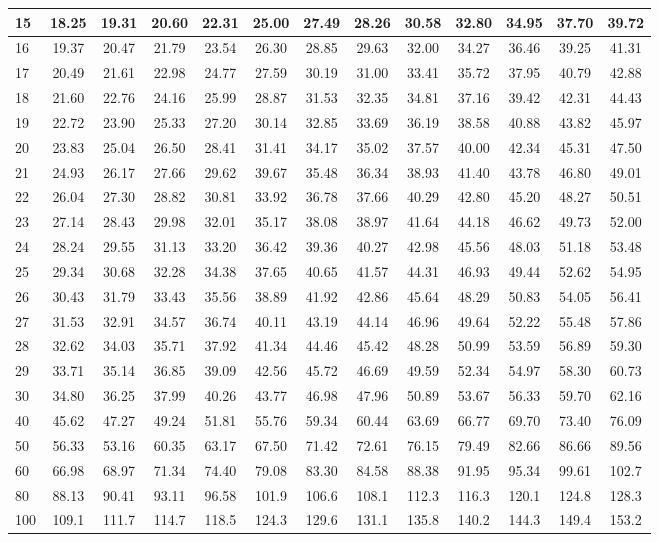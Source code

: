 \documentclass[11pt,openany]{book}\usepackage[]{graphicx}\usepackage[]{color}
\begin{document}
\begin{table}[h]
{\begin{tabular}{|l|c|c|c|c|c|c|c|c|c|c|c|c|}
15 & 18.25 & 19.31 & 20.60 & 22.31 & 25.00 & 27.49 & 28.26 & 30.58 & 32.80 & 34.95 & 37.70 & 39.72 \\ \hline
16 & 19.37 & 20.47 & 21.79 & 23.54 & 26.30 & 28.85 & 29.63 & 32.00 & 34.27 & 36.46 & 39.25 & 41.31 \\ \hline
17 & 20.49 & 21.61 & 22.98 & 24.77 & 27.59 & 30.19 & 31.00 & 33.41 & 35.72 & 37.95 & 40.79 & 42.88 \\ \hline
18 & 21.60 & 22.76 & 24.16 & 25.99 & 28.87 & 31.53 & 32.35 & 34.81 & 37.16 & 39.42 & 42.31 & 44.43 \\ \hline
19 & 22.72 & 23.90 & 25.33 & 27.20 & 30.14 & 32.85 & 33.69 & 36.19 & 38.58 & 40.88 & 43.82 & 45.97 \\ \hline
20 & 23.83 & 25.04 & 26.50 & 28.41 & 31.41 & 34.17 & 35.02 & 37.57 & 40.00 & 42.34 & 45.31 & 47.50 \\ \hline
21 & 24.93 & 26.17 & 27.66 & 29.62 & 39.67 & 35.48 & 36.34 & 38.93 & 41.40 & 43.78 & 46.80 & 49.01 \\ \hline
22 & 26.04 & 27.30 & 28.82 & 30.81 & 33.92 & 36.78 & 37.66 & 40.29 & 42.80 & 45.20 & 48.27 & 50.51 \\ \hline
23 & 27.14 & 28.43 & 29.98 & 32.01 & 35.17 & 38.08 & 38.97 & 41.64 & 44.18 & 46.62 & 49.73 & 52.00 \\ \hline
24 & 28.24 & 29.55 & 31.13 & 33.20 & 36.42 & 39.36 & 40.27 & 42.98 & 45.56 & 48.03 & 51.18 & 53.48 \\ \hline
25 & 29.34 & 30.68 & 32.28 & 34.38 & 37.65 & 40.65 & 41.57 & 44.31 & 46.93 & 49.44 & 52.62 & 54.95 \\ \hline
26 & 30.43 & 31.79 & 33.43 & 35.56 & 38.89 & 41.92 & 42.86 & 45.64 & 48.29 & 50.83 & 54.05 & 56.41 \\ \hline
27 & 31.53 & 32.91 & 34.57 & 36.74 & 40.11 & 43.19 & 44.14 & 46.96 & 49.64 & 52.22 & 55.48 & 57.86 \\ \hline
28 & 32.62 & 34.03 & 35.71 & 37.92 & 41.34 & 44.46 & 45.42 & 48.28 & 50.99 & 53.59 & 56.89 & 59.30 \\ \hline
29 & 33.71 & 35.14 & 36.85 & 39.09 & 42.56 & 45.72 & 46.69 & 49.59 & 52.34 & 54.97 & 58.30 & 60.73 \\ \hline
30 & 34.80 & 36.25 & 37.99 & 40.26 & 43.77 & 46.98 & 47.96 & 50.89 & 53.67 & 56.33 & 59.70 & 62.16 \\ \hline
40 & 45.62 & 47.27 & 49.24 & 51.81 & 55.76 & 59.34 & 60.44 & 63.69 & 66.77 & 69.70 & 73.40 & 76.09 \\ \hline
50 & 56.33 & 53.16 & 60.35 & 63.17 & 67.50 & 71.42 & 72.61 & 76.15 & 79.49 & 82.66 & 86.66 & 89.56 \\ \hline
60 & 66.98 & 68.97 & 71.34 & 74.40 & 79.08 & 83.30 & 84.58 & 88.38 & 91.95 & 95.34 & 99.61 & 102.7 \\ \hline
80 & 88.13 & 90.41 & 93.11 & 96.58 & 101.9 & 106.6 & 108.1 & 112.3 & 116.3 & 120.1 & 124.8 & 128.3 \\ \hline
100 & 109.1 & 111.7 & 114.7 & 118.5 & 124.3 & 129.6 & 131.1 & 135.8 & 140.2 & 144.3 & 149.4 & 153.2 \\ \hline
\end{tabular}
}
\end{table}
\FloatBarrier
\end{document}
